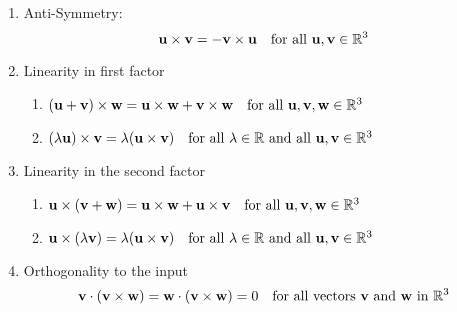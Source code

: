 \documentclass[10pt, a4paper]{article}
\begin{document}
\begin{proposition}
    \begin{enumerate}[label = (\roman*)]
        \item Anti-Symmetry:
        \[
        \mathbf{u \times v = -v \times u}\quad\text{for all }\mathbf{u, v} \in \mathbb{R} ^ 3
        \]
        \item Linearity in first factor
        \begin{enumerate}[label = (\arabic*)]
            \item $(\mathbf{u + v}) \times \mathbf{w} = \mathbf{u \times w} + \mathbf{v \times w}\quad\text{for all }\mathbf{u, v, w} \in \mathbb{R} ^ 3$
            \item $(\lambda\mathbf{u}) \times \mathbf{v} = \lambda(\mathbf{u \times v})\quad\text{for all } \lambda \in \mathbb{R} \text{ and all }\mathbf{u, v} \in \mathbb{R} ^ 3$
        \end{enumerate}
        \item Linearity in the second factor
        \begin{enumerate}[label = (\arabic*)]
            \item $\mathbf{u} \times (\mathbf{v + w}) = \mathbf{u \times w} + \mathbf{u \times v}\quad\text{for all }\mathbf{u, v, w} \in \mathbb{R} ^ 3$
            \item $\mathbf{u} \times (\lambda\mathbf{v}) = \lambda(\mathbf{u \times v})\quad\text{for all } \lambda \in \mathbb{R} \text{ and all }\mathbf{u, v} \in \mathbb{R} ^ 3$
        \end{enumerate}
        \item Orthogonality to the input
        \[
        \mathbf{v} \cdot (\mathbf{v \times w}) = \mathbf{w} \cdot (\mathbf{v \times w}) = 0\quad\text{for all vectors } \mathbf{v} \text{ and } \mathbf{w} \text{ in } \mathbb{R} ^ 3
        \]
    \end{enumerate}
\end{proposition}
\end{document}
